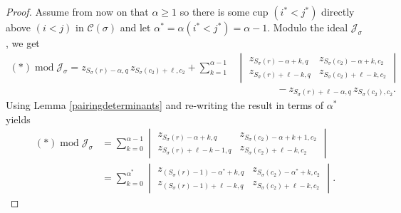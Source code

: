 \documentclass[11pt]{amsart}
\theoremstyle{remark}
\theoremstyle{remark}
\theoremstyle{definition}
\theoremstyle{definition}
\theoremstyle{definition}
\numberwithin{equation}{section}
\newcommand{\gs}{\sigma}
\newcommand{\cc}{\mathcal{C}}
\newcommand{\cj}{\mathcal{J}}
\newcommand{\al}{\alpha}
\newcommand{\cupsigma}{\cc(\gs)}
\begin{document}
\begin{proof}
Assume from now on that $\al\geq 1$ so there is some cup $(i^*< j^*)$ directly above $(i<j)$ in $\cupsigma$ and let $\al^*= \al(i^*<j^*)=\al-1$. Modulo the ideal $\cj_\gs$, we get
\begin{align*}
(*)\; \mathrm{mod}\; \cj_\gs =
z_{S_\sigma(r)-\al, q}\, z_{S_\gs(c_2)+\ell, c_2}+\displaystyle\sum_{k=1}^{\al-1}&\begin{vmatrix}
z_{S_\sigma(r)-\al+k, q}&z_{S_\sigma(c_2)-\al+k, c_2}\\
z_{S_\gs(r)+\ell-k, q} &  z_{S_\gs(c_2)+\ell-k, c_2}
\end{vmatrix}\\
&\quad\quad\quad\quad -z_{S_\gs(r)+\ell-\al, q}\, z_{S_\sigma(c_2), c_2}.
\end{align*}
Using Lemma \ref{pairingdeterminants} and re-writing the result in terms of $\al^*$ yields
\begin{align}\label{eqn.nextcup}
(*)\; \mathrm{mod}\; \cj_\gs &= \sum_{k=0}^{\al-1}\begin{vmatrix}
z_{S_\sigma(r)-\al+k, q}&z_{S_\sigma(c_2)-\al+k+1, c_2}\\
z_{S_\gs(r)+\ell-k-1, q} &  z_{S_\gs(c_2)+\ell-k, c_2}
\end{vmatrix}\\ 
&= \sum_{k=0}^{\alpha^*} \begin{vmatrix}
z_{(S_\sigma(r)-1)-\al^*+k, q}&z_{S_\sigma(c_2)-\al^*+k, c_2}\\ \nonumber
z_{(S_\gs(r)-1)+\ell-k, q} &  z_{S_\gs(c_2)+\ell-k, c_2}
\end{vmatrix}.
\end{align}


\end{proof}
\end{document}
